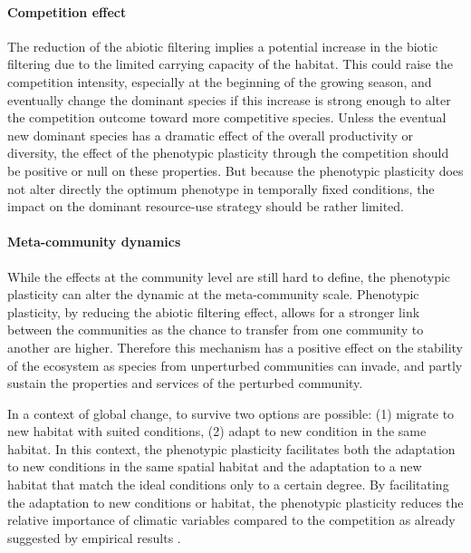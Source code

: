 \paragraph{Competition effect}

The reduction of the abiotic filtering implies a potential increase in the biotic filtering due to the limited carrying capacity of the habitat. This could raise the competition intensity, especially at the beginning of the growing season, and eventually change the dominant species if this increase is strong enough to alter the competition outcome toward more competitive species. Unless the eventual new dominant species has a dramatic effect of the overall productivity or diversity, the effect of the phenotypic plasticity through the competition should be positive or null on these properties. But because the phenotypic plasticity does not alter directly the optimum phenotype in temporally fixed conditions, the impact on the dominant resource-use strategy should be rather limited.

\paragraph{Meta-community dynamics}

While the effects at the community level are still hard to define, the phenotypic plasticity can alter the dynamic at the meta-community scale. Phenotypic plasticity, by reducing the abiotic filtering effect, allows for a stronger link between the communities as the chance to transfer from one community to another are higher. Therefore this mechanism has a positive effect on the stability of the ecosystem as species from unperturbed communities can invade, and partly sustain the properties and services of the perturbed community.

In a context of global change, to survive two options are possible: (1) migrate to new habitat with suited conditions, (2) adapt to new condition in the same habitat. In this context, the phenotypic plasticity facilitates both the adaptation to new conditions in the same spatial habitat and the adaptation to a new habitat that match the ideal conditions only to a certain degree. By facilitating the adaptation to new conditions or habitat, the phenotypic plasticity reduces the relative importance of climatic variables compared to the competition as already suggested by empirical results \parencite{alexander_novel_2015}.

%
 
